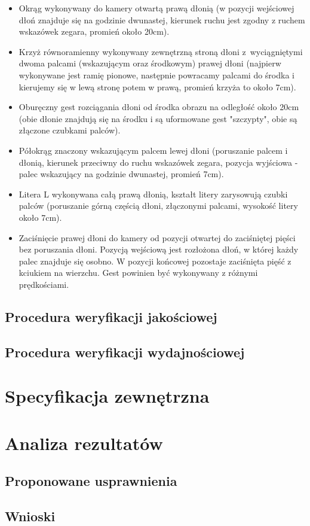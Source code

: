 \begin{itemize}
  \item Okrąg wykonywany do kamery otwartą prawą dłonią (w pozycji wejściowej dłoń znajduje się na godzinie dwunastej, kierunek ruchu jest zgodny z ruchem wskazówek zegara, promień około 20cm).
  \item Krzyż równoramienny wykonywany zewnętrzną stroną dłoni z~wyciągniętymi dwoma palcami (wskazującym oraz środkowym) prawej dłoni (najpierw wykonywane jest ramię pionowe, następnie powracamy palcami do środka i kierujemy się w lewą stronę potem w prawą, promień krzyża to około 7cm).
  \item Oburęczny gest rozciągania dłoni od środka obrazu na odległość około 20cm (obie dłonie znajdują się na środku i są uformowane gest "szczypty", obie są złączone czubkami palców).
  \item Półokrąg znaczony wskazującym palcem lewej dłoni (poruszanie palcem i dłonią, kierunek przeciwny do ruchu wskazówek zegara, pozycja wyjściowa - palec wskazujący na godzinie dwunastej, promień 7cm).
  \item Litera L wykonywana całą prawą dłonią, kształt litery zarysowują czubki palców (poruszanie górną częścią dłoni, złączonymi palcami, wysokość litery około 7cm).
  \item Zaciśnięcie prawej dłoni do kamery od pozycji otwartej do zaciśniętej pięści bez poruszania dłoni. Pozycją wejściową jest rozłożona dłoń, w której każdy palec znajduje się osobno. W pozycji końcowej pozostaje zaciśnięta pięść z kciukiem na wierzchu. Gest powinien być wykonywany z różnymi prędkościami.
\end{itemize}

\section{Procedura weryfikacji jakościowej}\label{Section_ProceduraWeryfikacjiJakosciowej}

\section{Procedura weryfikacji wydajnościowej}\label{Section_ProceduraWeryfikacjiWydajnosciowej}

\chapter{Specyfikacja zewnętrzna}\label{Chapter_SpecyfikacjaZewnetrzna}

\chapter{Analiza rezultatów}\label{Chapter_AnalizaRezultatow}

\section{Proponowane usprawnienia}\label{Section_Usprawnienia}
\cite{HandOverFaceOcclusion07}

\section{Wnioski}\label{Section_Wnioski}